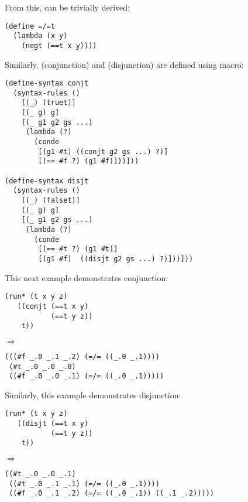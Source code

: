 From this,  can be trivially derived:
\begin{lstlisting}
(define =/=t
  (lambda (x y)
    (negt (==t x y))))
\end{lstlisting}

Similarly,  (conjunction) and  (disjunction) are defined using macro:
\begin{lstlisting}
(define-syntax conjt
  (syntax-rules ()
    [(_) (truet)]
    [(_ g) g]
    [(_ g1 g2 gs ...)
     (lambda (?)
       (conde
        [(g1 #t) ((conjt g2 gs ...) ?)]
        [(== #f ?) (g1 #f)]))]))

(define-syntax disjt
  (syntax-rules ()
    [(_) (falset)]
    [(_ g) g]
    [(_ g1 g2 gs ...)
     (lambda (?)
       (conde
        [(== #t ?) (g1 #t)]
        [(g1 #f)  ((disjt g2 gs ...) ?)]))]))
\end{lstlisting}

This next example demonstrates conjunction:
\begin{lstlisting}
(run* (t x y z)
   ((conjt (==t x y)
           (==t y z))
    t))
\end{lstlisting}
$\Rightarrow$
\begin{lstlisting}
(((#f _.0 _.1 _.2) (=/= ((_.0 _.1))))
 (#t _.0 _.0 _.0)
 ((#f _.0 _.0 _.1) (=/= ((_.0 _.1)))))
\end{lstlisting}

Similarly, this example demonstrates disjunction:
\begin{lstlisting}
(run* (t x y z)
   ((disjt (==t x y)
           (==t y z))
    t))
\end{lstlisting}
$\Rightarrow$
\begin{lstlisting}
((#t _.0 _.0 _.1)
 ((#t _.0 _.1 _.1) (=/= ((_.0 _.1))))
 ((#f _.0 _.1 _.2) (=/= ((_.0 _.1)) ((_.1 _.2)))))
\end{lstlisting}


